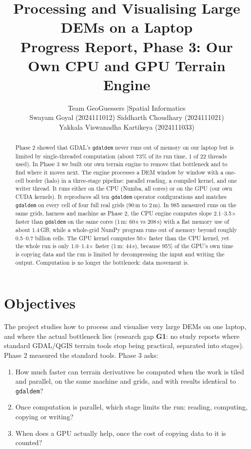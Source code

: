 ﻿\documentclass[11pt,a4paper]{article}
\title{\textbf{Processing and Visualising Large DEMs on a Laptop}\\[4pt]
\large Progress Report, Phase 3: Our Own CPU and GPU Terrain Engine}
\author{Team GeoGuessers \quad|\quad Spatial Informatics\\[4pt]
Swayam Goyal (2024111012) \quad Siddharth Choudhary (2024111021)\\
Yakkala Viswanadha Kartikeya (2024111033)}
\date{}
\begin{document}
\maketitle

\begin{abstract}
\noindent
Phase 2 showed that GDAL's \texttt{gdaldem} never runs out of memory on our laptop but is limited by
single-threaded computation (about 73\% of its run time, 1 of 22 threads used). In Phase 3 we built our own terrain
engine to remove that bottleneck and to find where it moves next. The engine processes a DEM window by window with a
one-cell border (halo) in a three-stage pipeline: parallel reading, a compiled kernel, and one writer thread. It runs
either on the CPU (Numba, all cores) or on the GPU (our own CUDA kernels). It reproduces all ten \texttt{gdaldem}
operator configurations and matches \texttt{gdaldem} on every cell of four full real grids (90\,m to 2\,m). In 985
measured runs on the same grids, harness and machine as Phase 2, the CPU engine computes slope 2.1--3.5$\times$
faster than \texttt{gdaldem} on the same cores (1\,m: 60\,s vs 208\,s) with a flat memory use of about 1.4\,GB,
while a whole-grid NumPy program runs out of memory beyond roughly 0.5--0.7 billion cells. The GPU kernel computes
50$\times$ faster than the CPU kernel, yet the whole run is only 1.0--1.4$\times$ faster (1\,m: 44\,s), because 95\%
of the GPU's own time is copying data and the run is limited by decompressing the input and writing the output.
Computation is no longer the bottleneck: data movement is.
\end{abstract}

\section{Objectives}
The project studies how to process and visualise very large DEMs on one laptop, and where the actual bottleneck
lies (research gap \textbf{G1}: no study reports where standard GDAL/QGIS terrain tools stop being practical,
separated into stages). Phase 2 measured the standard tools. Phase 3 asks:
\begin{enumerate}
  \item How much faster can terrain derivatives be computed when the work is tiled and parallel, on the same
  machine and grids, and with results identical to \texttt{gdaldem}?
  \item Once computation is parallel, which stage limits the run: reading, computing, copying or writing?
  \item When does a GPU actually help, once the cost of copying data to it is counted?
\end{enumerate}
\end{document}
